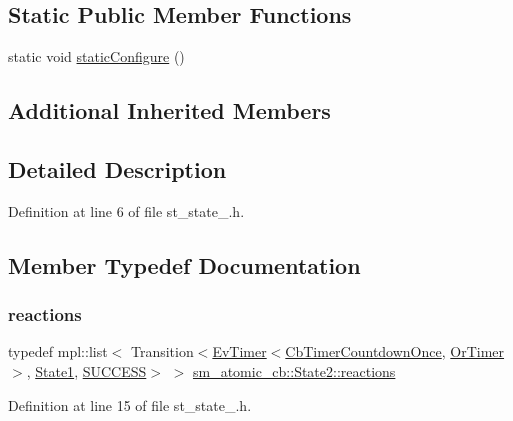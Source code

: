 \subsection*{Static Public Member Functions}
\begin{DoxyCompactItemize}
\item 
static void \hyperlink{structsm__atomic__cb_1_1State2_a51e882c506ec39461a039137f897f6d1}{static\+Configure} ()
\end{DoxyCompactItemize}
\subsection*{Additional Inherited Members}


\subsection{Detailed Description}


Definition at line 6 of file st\+\_\+state\+\_.\+h.



\subsection{Member Typedef Documentation}
\mbox{\label{structsm__atomic__cb_1_1State2_adfec734cfe3cac0b449fca9cc41a4ad2}} 
\subsubsection{\texorpdfstring{reactions}{reactions}}
{\footnotesize\ttfamily typedef mpl\+::list$<$ Transition$<$\hyperlink{structcl__ros__timer_1_1EvTimer}{Ev\+Timer}$<$\hyperlink{classcl__ros__timer_1_1CbTimerCountdownOnce}{Cb\+Timer\+Countdown\+Once}, \hyperlink{classsm__atomic__cb_1_1OrTimer}{Or\+Timer}$>$, \hyperlink{structsm__atomic__cb_1_1State1}{State1}, \hyperlink{structsmacc_1_1default__transition__tags_1_1SUCCESS}{S\+U\+C\+C\+E\+SS}$>$ $>$ \hyperlink{structsm__atomic__cb_1_1State2_adfec734cfe3cac0b449fca9cc41a4ad2}{sm\+\_\+atomic\+\_\+cb\+::\+State2\+::reactions}}



Definition at line 15 of file st\+\_\+state\+\_.\+h.



